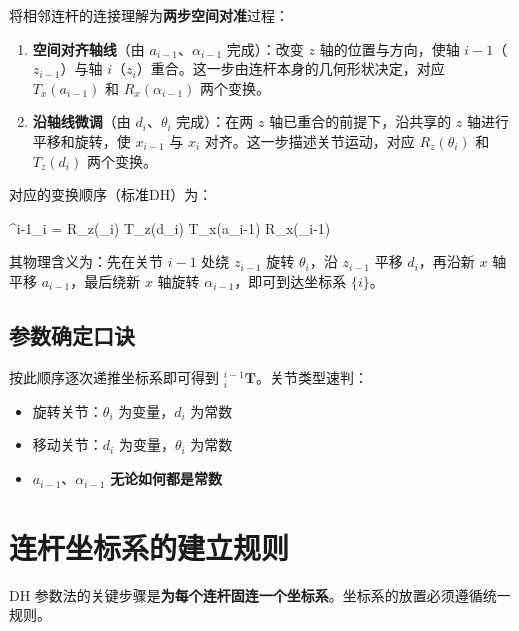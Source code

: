 将相邻连杆的连接理解为\textbf{两步空间对准}过程：

\begin{enumerate}
	\item \textbf{空间对齐轴线}（由 $a_{i-1}$、$\alpha_{i-1}$ 完成）：改变 $z$ 轴的位置与方向，使轴 $i-1$（$z_{i-1}$）与轴 $i$（$z_i$）重合。这一步由连杆本身的几何形状决定，对应 $T_x(a_{i-1})$ 和 $R_x(\alpha_{i-1})$ 两个变换。
	\item \textbf{沿轴线微调}（由 $d_i$、$\theta_i$ 完成）：在两 $z$ 轴已重合的前提下，沿共享的 $z$ 轴进行平移和旋转，使 $x_{i-1}$ 与 $x_i$ 对齐。这一步描述关节运动，对应 $R_z(\theta_i)$ 和 $T_z(d_i)$ 两个变换。
\end{enumerate}

对应的变换顺序（标准DH）为：

\begin{myformula}
	{}^{i-1}_{i} = R_z(\theta_i) \cdot T_z(d_i) \cdot T_x(a_{i-1}) \cdot R_x(\alpha_{i-1})
\end{myformula}

其物理含义为：先在关节 $i-1$ 处绕 $z_{i-1}$ 旋转 $\theta_i$，沿 $z_{i-1}$ 平移 $d_i$，再沿新 $x$ 轴平移 $a_{i-1}$，最后绕新 $x$ 轴旋转 $\alpha_{i-1}$，即可到达坐标系 $\{i\}$。

\subsection{参数确定口诀}

\begin{center}
\end{center}

按此顺序逐次递推坐标系即可得到 ${}^{i-1}_{i}\mathbf{T}$。关节类型速判：
\begin{itemize}
	\item 旋转关节：$\theta_i$ 为变量，$d_i$ 为常数
	\item 移动关节：$d_i$ 为变量，$\theta_i$ 为常数
	\item $a_{i-1}$、$\alpha_{i-1}$ \textbf{无论如何都是常数}
\end{itemize}

\section{连杆坐标系的建立规则}

DH 参数法的关键步骤是\textbf{为每个连杆固连一个坐标系}。坐标系的放置必须遵循统一规则。

